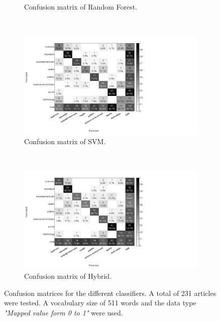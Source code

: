 \begin{figure}[H]
\begin{subfigure}[b]{\figwidth}
		\caption{Confusion matrix of Random Forest.}
		\label{fig:confmat-rf}
	\end{subfigure}
	~
	\begin{subfigure}[b]{\figwidth}
		\includegraphics[width=\textwidth,trim=0 0 350 0, clip]{img/SVM_percentile_5_count.png}
		\caption{Confusion matrix of SVM.}
		\label{fig:confmat-svm}
	\end{subfigure}
	\\
	\begin{subfigure}[b]{\figwidth}
		\includegraphics[width=\textwidth,trim=0 0 350 0, clip]{img/hybrid_percentile_5_count.png}
		\caption{Confusion matrix of Hybrid.}
		\label{fig:confmat-hybrid}
	\end{subfigure}
	\caption{Confusion matrices for the different classifiers. A total of 231 articles were tested. A vocabulary size of 511 words and the data type \emph{"Mapped value form 0 to 1"} were used.}
	\label{fig:hitrate}
\end{figure}
